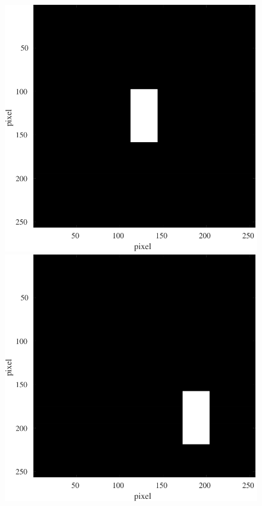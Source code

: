 \begin{figure}[H]
    \centering
    \begin{minipage}[b]{.2\textwidth}
        \centering
        \includegraphics[keepaspectratio,width=\textwidth]{../../Figures/08_31_rec1.pdf}
    \end{minipage}
    \begin{minipage}[b]{.2\textwidth}
        \centering
        \includegraphics[keepaspectratio,width=\textwidth]{../../Figures/08_32_rec2.pdf}

\end{minipage}
\end{figure}
